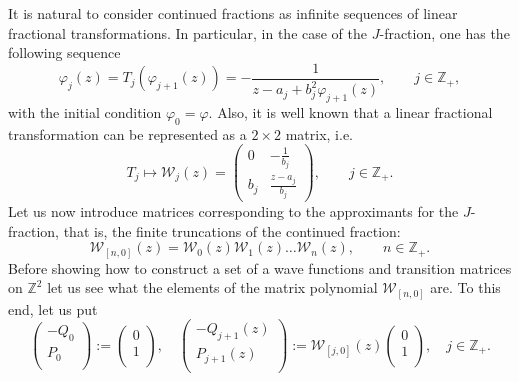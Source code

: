 \documentclass{amsart}
\theoremstyle{remark}
\numberwithin{equation}{section}
\begin{document}
It is natural to consider continued fractions as infinite sequences of linear fractional transformations. In particular,
in the case of the $J$-fraction, one has the following sequence
\begin{equation*}
    \varphi_j(z)=T_j\left(\varphi_{j+1}(z)\right)=-\frac{1}{z-a_j+
    b_j^2\varphi_{j+1}(z)}, \qquad j\in{{\mathbb Z}}_+,
\end{equation*}
with the initial condition $\varphi_0=\varphi$.
Also, it is well known that a linear fractional transformation can be represented as a $2\times 2$ matrix, i.e.
\begin{equation*}
T_j\mapsto{{\mathcal W}}_j(z)=\begin{pmatrix}0 & -\frac{1}{b_j}\\
                            b_j &  \frac{z-a_j}{b_j}
                            \end{pmatrix},\qquad j\in{{\mathbb Z}}_+.
\end{equation*}
Let us now introduce matrices corresponding to the approximants for the $J$-fraction, that is, the finite truncations
of the continued fraction:
\begin{equation}\label{helpW}
{{\mathcal W}}_{[n,0]}(z)={{\mathcal W}}_0(z){{\mathcal W}}_1(z)\dots{{\mathcal W}}_n(z), \qquad n\in{{\mathbb Z}}_+.
\end{equation}
Before showing how to construct a set of a wave functions and transition matrices on ${{\mathbb Z}}^2$ let us see what the elements
of the matrix polynomial ${{\mathcal W}}_{[n,0]}$ are. To this end, let us put
\begin{equation*}
   \left(\begin{array}{c}
  -Q_0 \\
  P_0 \\
\end{array}\right):=\left(\begin{array}{c}
  0 \\
  1 \\
\end{array}\right),\quad
\left(\begin{array}{c}
 -Q_{j+1}(z) \\
 P_{j+1}(z) \\
\end{array}\right):={{\mathcal W}}_{[j,0]}(z)\left(\begin{array}{c}
  0 \\
  1 \\
\end{array}\right), \quad j\in{{\mathbb Z}}_+ .
\end{equation*}
\end{document}
